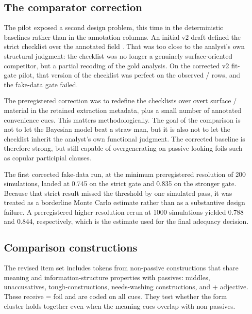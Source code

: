 \documentclass[12pt]{article}
\begin{document}
\subsection{The comparator correction}

The pilot exposed a second design problem, this time in the deterministic
baselines rather than in the annotation columns. An initial v2 draft defined
the strict checklist over the annotated field . That was
too close to the analyst's own structural judgment: the checklist was no longer
a genuinely surface-oriented competitor, but a partial recoding of the gold
analysis. On the corrected v2 fit-gate pilot, that version of the checklist was
perfect on the observed / rows, and the fake-data gate
failed.

The preregistered correction was to redefine the checklists over overt surface
/ material in the retained extraction metadata, plus a
small number of annotated convenience cues. This matters methodologically. The
goal of the comparison is not to let the Bayesian model beat a straw man, but
it is also not to let the checklist inherit the analyst's own functional
judgment. The corrected baseline is therefore strong, but still capable of
overgenerating on passive-looking foils such as copular participial clauses.

The first corrected fake-data run, at the minimum preregistered resolution of
200 simulations, landed at 0.745 on the strict gate and 0.835 on the stronger
gate. Because that strict result missed the threshold by one simulated pass, it
was treated as a borderline Monte Carlo estimate rather than as a substantive
design failure. A preregistered higher-resolution rerun at 1000 simulations
yielded 0.788 and 0.844, respectively, which is the estimate used for the
final adequacy decision.

\subsection{Comparison constructions}

The revised item set includes tokens from non-passive constructions that share meaning and information-structure properties with passives: middles, unaccusatives, tough-constructions, needs-washing constructions, and  + adjective. These receive  = foil and are coded on all cues. They test whether the form cluster holds together even when the meaning cues overlap with non-passives.
\end{document}
